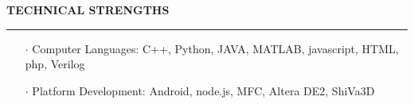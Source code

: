 \documentclass[11pt,letterpaper]{article}
\begin{document}
%
%

\vspace{1em}
\noindent
\MakeUppercase{\bf Technical Strengths}
\vspace{0.5em}
\hrule

\begin{itemize}
	\itemsep=-0.5em
	\item[$\cdot$] Computer Languages: C++, Python, JAVA, MATLAB, javascript, HTML, php, Verilog
	\item[$\cdot$] Platform Development: Android, node.js, MFC, Altera DE2, ShiVa3D
\end{itemize}
\end{document}
